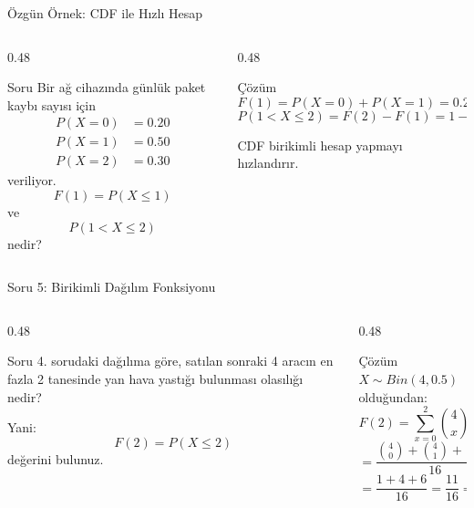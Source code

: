 \documentclass[light]{lutbeamer}
\begin{document}
\begin{frame}{Özgün Örnek: CDF ile Hızlı Hesap}
\small
\begin{columns}[T,onlytextwidth]
    \begin{column}{0.48\textwidth}
        \begin{block}{Soru}
            Bir ağ cihazında günlük paket kaybı sayısı için
            \[
            \begin{aligned}
            P(X=0)&=0.20 \\
            P(X=1)&=0.50 \\
            P(X=2)&=0.30
            \end{aligned}
            \]
            veriliyor.
            \[
            F(1)=P(X \le 1)
            \]
            ve
            \[
            P(1 < X \le 2)
            \]
            nedir?
        \end{block}
    \end{column}
    \begin{column}{0.48\textwidth}
        \begin{exampleblock}{Çözüm}
            \[
            F(1)=P(X=0)+P(X=1)=0.20+0.50=0.70
            \]
            \[
            P(1 < X \le 2)=F(2)-F(1)=1-0.70=0.30
            \]

            CDF birikimli hesap yapmayı hızlandırır.
        \end{exampleblock}
    \end{column}
\end{columns}
\end{frame}

\begin{frame}{Soru 5: Birikimli Dağılım Fonksiyonu}
\scriptsize
\begin{columns}[T,onlytextwidth]
    \begin{column}{0.48\textwidth}
        \begin{block}{Soru}
            4. sorudaki dağılıma göre, satılan sonraki 4 aracın en fazla 2 tanesinde yan hava yastığı bulunması olasılığı nedir?

            \vspace{0.15cm}
            Yani:
            \[
            F(2)=P(X \le 2)
            \]
            değerini bulunuz.
        \end{block}
    \end{column}
    \begin{column}{0.48\textwidth}
        \begin{exampleblock}{Çözüm}
            $X \sim Bin(4,0.5)$ olduğundan:
            \[
            F(2)=\sum_{x=0}^{2}\binom{4}{x}(0.5)^4
            \]
            \[
            =\frac{\binom{4}{0}+\binom{4}{1}+\binom{4}{2}}{16}
            \]
            \[
            =\frac{1+4+6}{16}=\frac{11}{16}=0.6875
            \]
        \end{exampleblock}
    \end{column}
\end{columns}
\end{frame}
\end{document}
